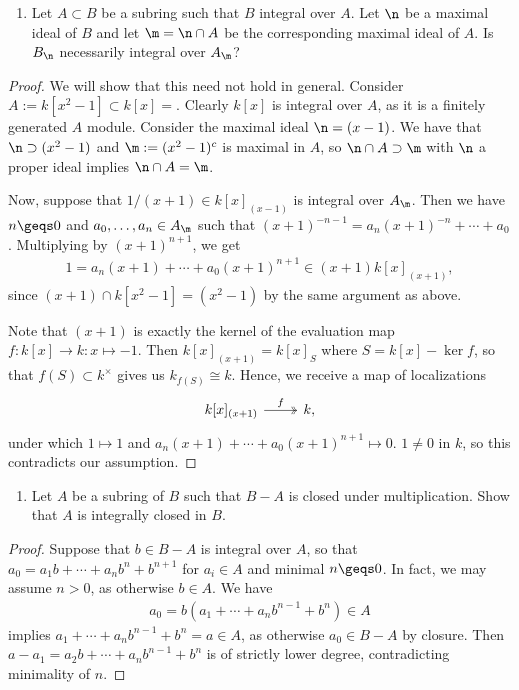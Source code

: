 \documentclass[12pt]{amsart}
\begin{document}
\begin{enumerate}
  \item[5.4] {
      Let $A\subset B$ be a subring such that $B$ integral over $A$.
      Let $\n$ be a maximal ideal of $B$ and let $\m=\n\cap A$ be the corresponding maximal ideal of $A$.
      Is $B_\n$ necessarily integral over $A_\m$?
    }
\end{enumerate}

\begin{proof}
  We will show that this need not hold in general.
  Consider $A:=k[x^2-1]\subset k[x]=$.
  Clearly $k[x]$ is integral over $A$, as it is a finitely generated $A$ module.
  Consider the maximal ideal $\n=(x-1)$.
  We have that $\n\supset (x^2-1)$ and $\m:=(x^2-1)^c$ is maximal in $A$, so $\n\cap A\supset \m$ with $\n$ a proper ideal implies $\n\cap A=\m$.

  Now, suppose that $1/(x+1)\in k[x]_{(x-1)}$ is integral over $A_\m$.
  Then we have $n\geqs0$ and $a_0,\ldots,a_n\in A_\m$ such that $(x+1)^{-n-1}=a_n(x+1)^{-n}+\cdots+a_0$.
  Multiplying by $(x+1)^{n+1}$, we get
  \begin{align*}
    1 = a_n (x+1) +\cdots + a_0 (x+1)^{n+1}\in (x+1)k[x]_{(x+1)},
  \end{align*}
  since $(x+1)\cap k[x^2-1]=(x^2-1)$ by the same argument as above.

  Note that $(x+1)$ is exactly the kernel of the evaluation map $f:k[x]\to k:x\mapsto -1$.
  Then $k[x]_{(x+1)}=k[x]_S$ where $S= k[x]-\ker f$, so that $f(S)\subset k^\times$ gives us $k_{f(S)}\cong k$.
  Hence, we receive a map of localizations
  \[
    \begin{tikzcd}
      k[x]_{(x+1)}\ar[r,twoheadrightarrow,"f"] & k,
    \end{tikzcd}
  \] 
  under which $1\mapsto 1$ and $a_n(x+1)+\cdots+a_0(x+1)^{n+1}\mapsto 0$.
  $1\neq 0$ in $k$, so this contradicts our assumption.
\end{proof}

\begin{enumerate}
  \item[5.7] {
      Let $A$ be a subring of $B$ such that $B- A$ is closed under multiplication. 
      Show that $A$ is integrally closed in $B$.
    }
\end{enumerate}

\begin{proof}
  Suppose that $b\in B-A$ is integral over $A$, so that $a_0=a_1b+\cdots +a_nb^n+b^{n+1}$ for $a_i\in A$ and minimal $n\geqs 0$.
  In fact, we may assume $n>0$, as otherwise $b\in A$.
  We have
  \begin{align*}
    a_0 = b(a_1+\cdots + a_nb^{n-1}+b^n) \in A
  \end{align*}
  implies $a_1+\cdots + a_nb^{n-1}+b^n=a\in A$, as otherwise $a_0\in B-A$ by closure.
  Then $a-a_1= a_2b+\cdots +a_nb^{n-1}+b^n$ is of strictly lower degree, contradicting minimality of $n$.
\end{proof}
\end{document}
